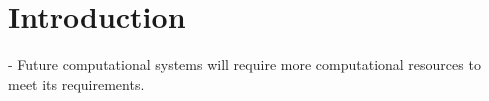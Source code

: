 \chapter{Introduction}

- Future computational systems will require more computational resources to meet 
its requirements.  


